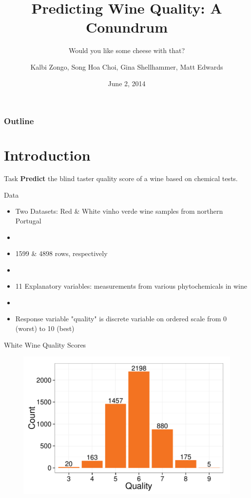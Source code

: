 \documentclass{beamer}
\title{Predicting Wine Quality: A Conundrum}
\subtitle{Would you like some cheese with that?}
\author{Kalbi Zongo, Song Hoa Choi, Gina Shellhammer, Matt Edwards}
\date{June 2, 2014}
\begin{document}
\begin{frame}
	\titlepage
\end{frame}

\begin{frame}
	\frametitle{Outline}
	\tableofcontents
\end{frame}

\section{Introduction}
\begin{frame}{Task}
	\textbf{Predict} the blind taster quality score of a wine based on chemical tests.

\end{frame}

\begin{frame}{Data}
\begin{itemize}
	\item Two Datasets: Red \& White vinho verde wine samples from northern Portugal
	\item[]
	\item 1599 \& 4898 rows, respectively
	\item[]
	\item 11 Explanatory variables: measurements from various phytochemicals in wine
	\item[]
	\item Response variable "quality" is discrete variable on ordered scale from 0 (worst) to 10 (best)
\end{itemize}
\end{frame}

\begin{frame}{White Wine Quality Scores}
\begin{figure}
	\centering
	\includegraphics[width=\textwidth]{../images/white_hist.pdf}
\end{figure}
\end{frame}
\end{document}
